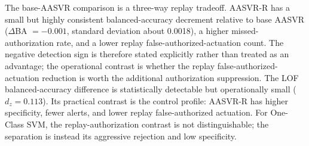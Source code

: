 \documentclass[preprint,12pt,doubleblind]{elsarticle}
\begin{document}
\begin{table}[!htbp]
\centering
\caption{Paired held-out effects for AASVR-R against representative methods. Positive $\Delta$BA means AASVR-R has higher per-trial balanced accuracy; positive $\Delta$replay false authorization means the comparison method has more replay false-authorized actuations than AASVR-R. $d_z$ is the paired standardized BA effect size; $p_{\mathrm{FA,sign}}$ is Holm-corrected for the sign-test replay-authorization family.}
\label{tab:paired_effects}
\footnotesize
{}
\end{table}

The base-AASVR comparison is a three-way replay tradeoff. AASVR-R has a small but highly consistent balanced-accuracy decrement relative to base AASVR ($\Delta$BA $=-0.001$, standard deviation about 0.0018), a higher missed-authorization rate, and a lower replay false-authorized-actuation count. The negative detection sign is therefore stated explicitly rather than treated as an advantage; the operational contrast is whether the replay false-authorized-actuation reduction is worth the additional authorization suppression. The LOF balanced-accuracy difference is statistically detectable but operationally small ($d_z=0.113$). Its practical contrast is the control profile: AASVR-R has higher specificity, fewer alerts, and lower replay false-authorized actuation. For One-Class SVM, the replay-authorization contrast is not distinguishable; the separation is instead its aggressive rejection and low specificity.
\end{document}
